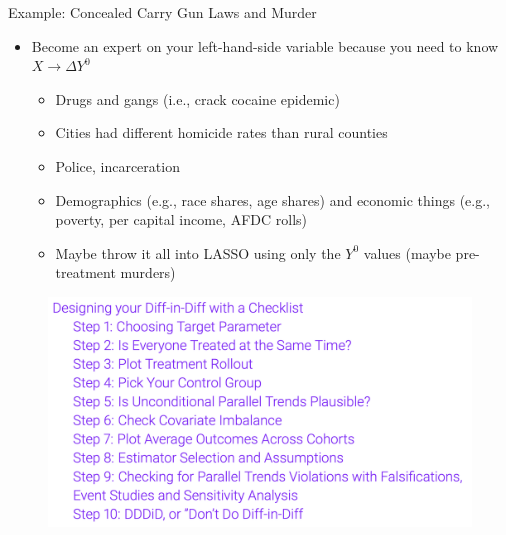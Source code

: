 \documentclass{beamer}
\begin{document}
\begin{frame}{Example: Concealed Carry Gun Laws and Murder}

\begin{itemize}
\item Become an expert on your left-hand-side variable because you need to know $X \rightarrow \Delta Y^0$
	\begin{itemize}
	\item Drugs and gangs (i.e., crack cocaine epidemic)
	\item Cities had different homicide rates than rural counties
	\item Police, incarceration
	\item Demographics (e.g., race shares, age shares) and economic things (e.g., poverty, per capital income, AFDC rolls)
	\item Maybe throw it all into LASSO using only the $Y^0$ values (maybe pre-treatment murders)
	\end{itemize}
\end{itemize}

\end{frame}



\begin{frame}
 
\begin{figure}
    \centering
    \includegraphics[width=\textwidth]{./lecture_includes/checklist}
\end{figure}

\end{frame}
\end{document}
